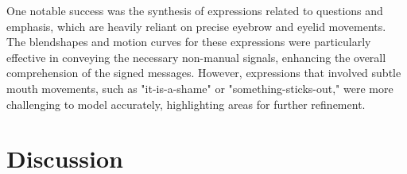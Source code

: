 \documentclass[../../main.tex]{subfiles}
\begin{document}
One notable success was the synthesis of expressions related to questions and emphasis, which are heavily reliant on precise eyebrow and eyelid movements. The blendshapes and motion curves for these expressions were particularly effective in conveying the necessary non-manual signals, enhancing the overall comprehension of the signed messages. However, expressions that involved subtle mouth movements, such as "it-is-a-shame" or "something-sticks-out," were more challenging to model accurately, highlighting areas for further refinement.

\section{Discussion}
\end{document}
